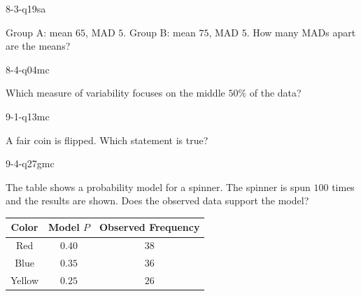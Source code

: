 \begin{practiceQuestion}{8-3-q19}{sa}
\begin{questionText}
Group A: mean $65$, MAD $5$. Group B: mean $75$, MAD $5$. How many MADs apart are the means?
\end{questionText}
\end{practiceQuestion}

\begin{practiceQuestion}{8-4-q04}{mc}
\begin{questionText}
Which measure of variability focuses on the middle $50\%$ of the data?
\end{questionText}
\end{practiceQuestion}

\begin{practiceQuestion}{9-1-q13}{mc}
\begin{questionText}
A fair coin is flipped. Which statement is true?
\end{questionText}
\end{practiceQuestion}

\begin{practiceQuestion}{9-4-q27}{gmc}
\begin{questionText}
The table shows a probability model for a spinner. The spinner is spun $100$ times and the results are shown. Does the observed data support the model?

\begin{center}
\begin{tabular}{|c|c|c|}
\hline
\textbf{Color} & \textbf{Model $P$} & \textbf{Observed Frequency} \\
\hline
Red & $0.40$ & $38$ \\
\hline
Blue & $0.35$ & $36$ \\
\hline
Yellow & $0.25$ & $26$ \\
\hline
\end{tabular}
\end{center}
\end{questionText}
\end{practiceQuestion}

